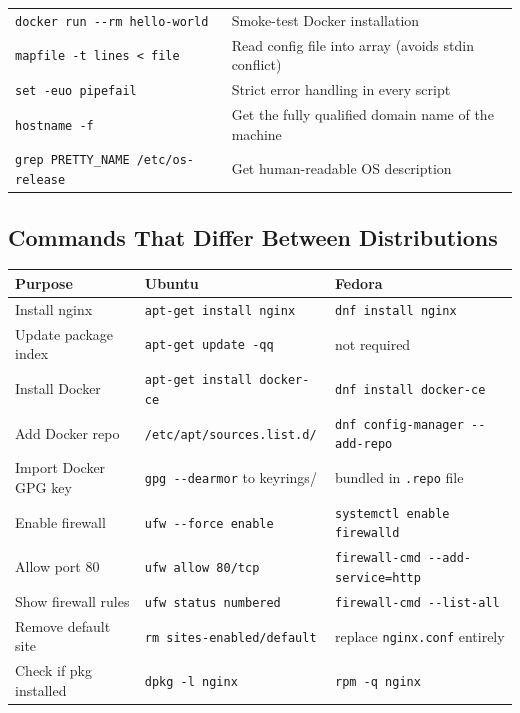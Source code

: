 \documentclass[11pt,a4paper]{article}
\begin{document}
\begin{center}
\begin{longtable}{L{5cm}L{8.5cm}}
\texttt{docker run -{}-rm hello-world} & Smoke-test Docker installation \\
\texttt{mapfile -t lines < file}     & Read config file into array (avoids stdin conflict) \\
\texttt{set -euo pipefail}           & Strict error handling in every script \\
\texttt{hostname -f}                 & Get the fully qualified domain name of the machine \\
\texttt{grep PRETTY\_NAME /etc/os-release} & Get human-readable OS description \\
\bottomrule
\end{longtable}
\end{center}

\subsection{Commands That Differ Between Distributions}

\begin{center}
\begin{longtable}{L{3.8cm}L{4.6cm}L{4.6cm}}
\toprule
\textbf{Purpose} & \textbf{Ubuntu} & \textbf{Fedora} \\
\midrule
\endhead
Install nginx           & \texttt{apt-get install nginx}    & \texttt{dnf install nginx} \\
Update package index    & \texttt{apt-get update -qq}       & not required \\
Install Docker          & \texttt{apt-get install docker-ce}& \texttt{dnf install docker-ce} \\
Add Docker repo         & \texttt{/etc/apt/sources.list.d/} & \texttt{dnf config-manager -{}-add-repo} \\
Import Docker GPG key   & \texttt{gpg -{}-dearmor} to keyrings/ & bundled in \texttt{.repo} file \\
Enable firewall         & \texttt{ufw -{}-force enable}     & \texttt{systemctl enable firewalld} \\
Allow port 80           & \texttt{ufw allow 80/tcp}         & \texttt{firewall-cmd -{}-add-service=http} \\
Show firewall rules     & \texttt{ufw status numbered}      & \texttt{firewall-cmd -{}-list-all} \\
Remove default site     & \texttt{rm sites-enabled/default} & replace \texttt{nginx.conf} entirely \\
Check if pkg installed  & \texttt{dpkg -l nginx}            & \texttt{rpm -q nginx} \\
\bottomrule
\end{longtable}
\end{center}
\end{document}
